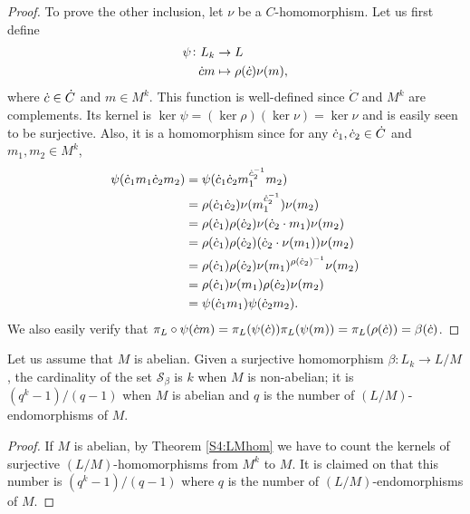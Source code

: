 \begin{proof}
    To prove the other inclusion, let $\nu$ be a $C$-homomorphism. 
    Let us first define
    \begin{align*}
        \psi \colon L_k &\rightarrow L \\
                \dot{c} m &\mapsto \rho(\dot{c})\nu(m),
    \end{align*}
    where $\dot{c} \in \dot C$ and $m \in M^k$.
    This function is well-defined since $\dot{C}$ and $M^k$ are complements. Its kernel is $\ker \psi = (\ker \rho) (\ker \nu) = \ker \nu$ and is easily seen to be surjective. Also, it is a homomorphism since for any $\dot{c}_1, \dot{c}_2 \in \dot{C}$ and $m_1, m_2 \in M^k$,
    \begin{align*}
        \psi(\dot{c}_1 m_1 \dot{c}_2 m_2) &= \psi(\dot{c}_1 \dot{c}_2 m_1^{\dot{c}_2^{-1}} m_2) \\
                                   &= \rho(\dot{c}_1 \dot{c}_2) \nu(m_1^{\dot{c}_2^{-1}}) \nu(m_2) \\
                                   &= \rho(\dot{c}_1) \rho(\dot{c}_2) \nu(\dot{c}_2 \cdot m_1) \nu(m_2) \\
                                   &= \rho(\dot{c}_1) \rho(\dot{c}_2) (\dot{c}_2 \cdot \nu(m_1)) \nu(m_2) \\
                                   &= \rho(\dot{c}_1) \rho(\dot{c}_2) \nu(m_1)^{\rho(\dot{c}_2)^{-1}} \nu(m_2) \\
                                   &= \rho(\dot{c}_1) \nu(m_1) \rho(\dot{c}_2) \nu(m_2) \\
                                   &= \psi(\dot{c}_1 m_1) \psi(\dot{c}_2 m_2).
    \end{align*}
    We also easily verify that $\pi_L \circ \psi(\dot{c} m) = \pi_L(\psi(\dot{c}))\pi_L(\psi(m))=\pi_L(\rho(\dot{c})) = \beta(\dot{c})$.
    \end{proof}

    \begin{theorem}
        \label{cardSA}
        Let us assume that $M$ is abelian. Given a surjective homomorphism $\beta \colon L_k \rightarrow L/M$, the cardinality of the set $\mathscr{S}_\beta$ is $k$ when $M$ is non-abelian; it is $(q^k-1)/(q-1)$ when $M$ is abelian and $q$ is the number of $(L/M)$-endomorphisms of $M$.
    \end{theorem}

    \begin{proof}
        If $M$ is abelian, by Theorem \ref{S4:LMhom} we have to count the kernels of surjective $(L/M)$-homomorphisms from $M^k$ to $M$. It is claimed on \cite[Lemma 2.5]{DallaVoltaFGNMGAPQ} that this number is $(q^k-1)/(q-1)$ where $q$ is the number of $(L/M)$-endomorphisms of $M$.
    \end{proof}




